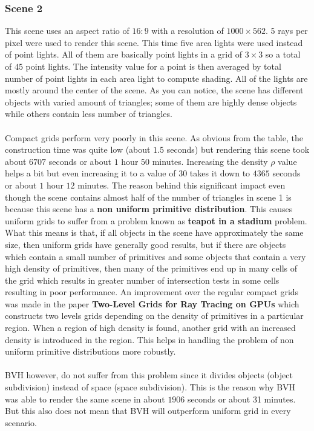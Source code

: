 \documentclass[11pt,a4paper]{article}
\begin{document}
\subsubsection{Scene 2}
This scene uses an aspect ratio of $16:9$ with a resolution of $1000 \times 562$. 5 rays per pixel were used to render this scene. This time five area lights were used instead of point lights. All of them are basically point lights in a grid of $3 \times 3$ so a total of $45$ point lights. The intensity value for a point is then averaged by total number of point lights in each area light to compute shading. All of the lights are mostly around the center of the scene. As you can notice, the scene has different objects with varied amount of triangles; some of them are highly dense objects while others contain less number of triangles.
\\~\\
Compact grids perform very poorly in this scene. As obvious from the table, the construction time was quite low (about $1.5$ seconds) but rendering this scene took about $6707$ seconds or about $1$ hour $50$ minutes. Increasing the density $\rho$ value helps a bit but even increasing it to a value of $30$ takes it down to $4365$ seconds or about $1$ hour $12$ minutes. The reason behind this significant impact even though the scene contains almost half of the number of triangles in scene 1 is because this scene has a \textbf{non uniform primitive distribution}. This causes uniform grids to suffer from a problem known as \textbf{teapot in a stadium} \cite{utahteapot} problem. What this means is that, if all objects in the scene have approximately the same size, then uniform grids have generally good results, but if there are objects which contain a small number of primitives and some objects that contain a very high density of primitives, then many of the primitives end up in many cells of the grid which results in greater number of intersection tests in some cells resulting in poor performance. An improvement over the regular compact grids was made in the paper \textbf{Two-Level Grids for Ray Tracing on GPUs} \cite{kalojanov2011two} which constructs two levels grids depending on the density of primitives in a particular region. When a region of high density is found, another grid with an increased density is introduced in the region. This helps in handling the problem of non uniform primitive distributions more robustly.
\\~\\
BVH however, do not suffer from this problem since it divides objects (object subdivision) instead of space (space subdivision). This is the reason why BVH was able to render the same scene in about $1906$ seconds or about 31 minutes. But this also does not mean that BVH will outperform uniform grid in every scenario. 
\end{document}
